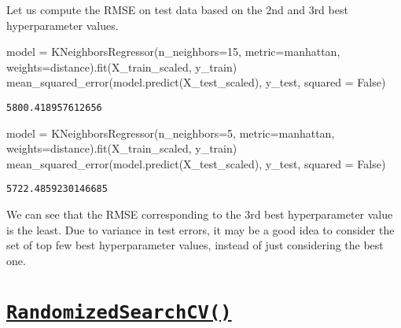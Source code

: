 \documentclass[
  letterpaper,
  DIV=11,
  numbers=noendperiod]{scrreprt}
\newenvironment{Shaded}{\begin{snugshade}}{\end{snugshade}}
\newcommand{\DecValTok}[1]{\textcolor[rgb]{0.68,0.00,0.00}{#1}}
\newcommand{\NormalTok}[1]{\textcolor[rgb]{0.00,0.23,0.31}{#1}}
\newcommand{\OperatorTok}[1]{\textcolor[rgb]{0.37,0.37,0.37}{#1}}
\newcommand{\StringTok}[1]{\textcolor[rgb]{0.13,0.47,0.30}{#1}}
\newcommand{\VariableTok}[1]{\textcolor[rgb]{0.07,0.07,0.07}{#1}}
\begin{document}
Let us compute the RMSE on test data based on the 2nd and 3rd best
hyperparameter values.

\begin{Shaded}
\begin{Highlighting}[]
\NormalTok{model }\OperatorTok{=}\NormalTok{ KNeighborsRegressor(n\_neighbors}\OperatorTok{=}\DecValTok{15}\NormalTok{, metric}\OperatorTok{=}\StringTok{\textquotesingle{}manhattan\textquotesingle{}}\NormalTok{, weights}\OperatorTok{=}\StringTok{\textquotesingle{}distance\textquotesingle{}}\NormalTok{).fit(X\_train\_scaled, y\_train)}
\NormalTok{mean\_squared\_error(model.predict(X\_test\_scaled), y\_test, squared }\OperatorTok{=} \VariableTok{False}\NormalTok{)}
\end{Highlighting}
\end{Shaded}

\begin{verbatim}
5800.418957612656
\end{verbatim}

\begin{Shaded}
\begin{Highlighting}[]
\NormalTok{model }\OperatorTok{=}\NormalTok{ KNeighborsRegressor(n\_neighbors}\OperatorTok{=}\DecValTok{5}\NormalTok{, metric}\OperatorTok{=}\StringTok{\textquotesingle{}manhattan\textquotesingle{}}\NormalTok{, weights}\OperatorTok{=}\StringTok{\textquotesingle{}distance\textquotesingle{}}\NormalTok{).fit(X\_train\_scaled, y\_train)}
\NormalTok{mean\_squared\_error(model.predict(X\_test\_scaled), y\_test, squared }\OperatorTok{=} \VariableTok{False}\NormalTok{)}
\end{Highlighting}
\end{Shaded}

\begin{verbatim}
5722.4859230146685
\end{verbatim}

We can see that the RMSE corresponding to the 3rd best hyperparameter
value is the least. Due to variance in test errors, it may be a good
idea to consider the set of top few best hyperparameter values, instead
of just considering the best one.

\section{\texorpdfstring{\href{https://scikit-learn.org/stable/modules/generated/sklearn.model_selection.RandomizedSearchCV.html}{\texttt{RandomizedSearchCV()}}}{RandomizedSearchCV()}}\label{randomizedsearchcv-1}
\end{document}
